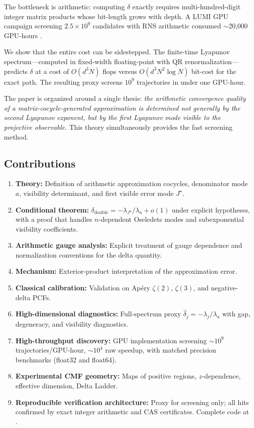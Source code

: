 \documentclass[11pt]{article}
\begin{document}
The bottleneck is arithmetic: computing $\delta$ exactly requires multi-hundred-digit integer matrix products whose bit-length grows with depth. A LUMI GPU campaign screening $2.5 \times 10^9$ candidates with RNS arithmetic consumed $\sim$20{,}000 GPU-hours \cite{vesterlund2026}.

We show that the entire cost can be sidestepped. The finite-time Lyapunov spectrum---computed in fixed-width floating-point with QR renormalization---predicts $\delta$ at a cost of $O(d^3 N)$ flops versus $O(d^3 N^2 \log N)$ bit-cost for the exact path. The resulting proxy screens $10^9$ trajectories in under one GPU-hour.

The paper is organized around a single thesis: \emph{the arithmetic convergence quality of a matrix-cocycle-generated approximation is determined not generally by the second Lyapunov exponent, but by the first Lyapunov mode visible to the projective observable.} This theory simultaneously provides the fast screening method.

\subsection{Contributions}

\begin{enumerate}
\item \textbf{Theory:} Definition of arithmetic approximation cocycles, denominator mode $a$, visibility determinant, and first visible error mode $J^\star$.
\item \textbf{Conditional theorem:} $\delta_{\mathrm{double}} = -\lambda_{J^\star}/\lambda_a + o(1)$ under explicit hypotheses, with a proof that handles $n$-dependent Oseledets modes and subexponential visibility coefficients.
\item \textbf{Arithmetic gauge analysis:} Explicit treatment of gauge dependence and normalization conventions for the delta quantity.
\item \textbf{Mechanism:} Exterior-product interpretation of the approximation error.
\item \textbf{Classical calibration:} Validation on Ap\'ery $\zeta(2)$, $\zeta(3)$, and negative-delta PCFs.
\item \textbf{High-dimensional diagnostics:} Full-spectrum proxy $\hat\delta_j = -\lambda_j/\lambda_a$ with gap, degeneracy, and visibility diagnostics.
\item \textbf{High-throughput discovery:} GPU implementation screening $\sim 10^9$ trajectories/GPU-hour, $\sim 10^4$ raw speedup, with matched precision benchmarks (float32 and float64).
\item \textbf{Experimental CMF geometry:} Maps of positive regions, $z$-dependence, effective dimension, Delta Ladder.
\item \textbf{Reproducible verification architecture:} Proxy for screening only; all hits confirmed by exact integer arithmetic and CAS certificates. Complete code at \cite{deltaproxy_repo}.
\end{enumerate}
\end{document}
